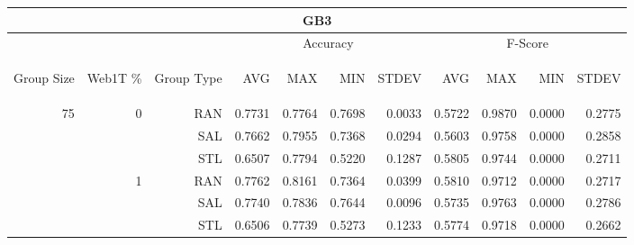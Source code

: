 \begin{center}
\begin{table}[htbp]
\begin{tabular}{ | r | r | r | r | r | r | r | r | r | r | r |}
\hline
\multicolumn{11}{|c|}{GB3}\\
\hline
 & & & \multicolumn{4}{|c|}{Accuracy} & \multicolumn{4}{|c|}{F-Score}\\ \cline{4-11}
\begin{sideways}Group Size\end{sideways} & \begin{sideways}Web1T \%\end{sideways} & \begin{sideways}Group Type\end{sideways} & \begin{sideways}AVG\end{sideways} & \begin{sideways}MAX\end{sideways} & \begin{sideways}MIN\end{sideways} & \begin{sideways}STDEV\end{sideways} & \begin{sideways}AVG\end{sideways} & \begin{sideways}MAX\end{sideways} & \begin{sideways}MIN\end{sideways} & \begin{sideways}STDEV\end{sideways}\\
\hline
\multirow{12}{*}{75}
 & \multirow{3}{*}{0} & RAN & 0.7731 & 0.7764 & 0.7698 & 0.0033 & 0.5722 & 0.9870 & 0.0000 & 0.2775\\ \cline{3-11}
 &   & SAL & 0.7662 & 0.7955 & 0.7368 & 0.0294 & 0.5603 & 0.9758 & 0.0000 & 0.2858\\ \cline{3-11}
 &   & STL & 0.6507 & 0.7794 & 0.5220 & 0.1287 & 0.5805 & 0.9744 & 0.0000 & 0.2711\\ \cline{2-11}
 & \multirow{3}{*}{1} & RAN & 0.7762 & 0.8161 & 0.7364 & 0.0399 & 0.5810 & 0.9712 & 0.0000 & 0.2717\\ \cline{3-11}
 &   & SAL & 0.7740 & 0.7836 & 0.7644 & 0.0096 & 0.5735 & 0.9763 & 0.0000 & 0.2786\\ \cline{3-11}
 &   & STL & 0.6506 & 0.7739 & 0.5273 & 0.1233 & 0.5774 & 0.9718 & 0.0000 & 0.2662\\ \cline{2-11}

\end{tabular}
\end{table}
\end{center}
